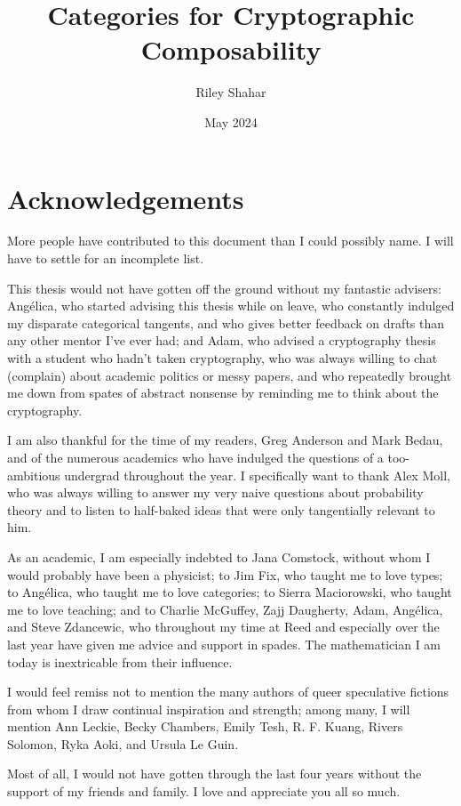 \documentclass[12pt,twoside]{reedthesis}
\title{Categories for Cryptographic Composability}
\author{Riley Shahar}
\date{May 2024}
\begin{document}
\maketitle
\frontmatter
\pagestyle{empty}

\chapter*{Acknowledgements}

More people have contributed to this document than I could possibly name. I will
have to settle for an incomplete list.

This thesis would not have gotten off the ground without my fantastic advisers:
Angélica, who started advising this thesis while on leave, who constantly
indulged my disparate categorical tangents, and who gives better feedback on
drafts than any other mentor I've ever had; and Adam, who advised a cryptography
thesis with a student who hadn't taken cryptography, who was always willing to
chat (complain) about academic politics or messy papers, and who repeatedly
brought me down from spates of abstract nonsense by reminding me to think about
the cryptography.

I am also thankful for the time of my readers, Greg Anderson and Mark Bedau, and
of the numerous academics who have indulged the questions of a too-ambitious
undergrad throughout the year. I specifically want to thank Alex Moll, who was
always willing to answer my very naive questions about probability theory and to
listen to half-baked ideas that were only tangentially relevant to him.

As an academic, I am especially indebted to Jana Comstock, without whom I would
probably have been a physicist; to Jim Fix, who taught me to love types; to
Angélica, who taught me to love categories; to Sierra Maciorowski, who taught me
to love teaching; and to Charlie McGuffey, Zajj Daugherty, Adam, Angélica, and
Steve Zdancewic, who throughout my time at Reed and especially over the last
year have given me advice and support in spades. The mathematician I am
today is inextricable from their influence.

I would feel remiss not to mention the many authors of queer speculative
fictions from whom I draw continual inspiration and strength; among many, I will
mention Ann Leckie, Becky Chambers, Emily Tesh, R. F. Kuang, Rivers Solomon,
Ryka Aoki, and Ursula Le Guin.

Most of all, I would not have gotten through the last four years without the
support of my friends and family. I love and appreciate you all so much.
\end{document}
